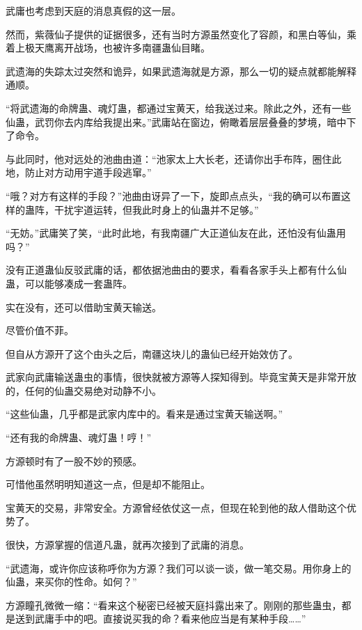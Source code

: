 
\begin{this_body}

武庸也考虑到天庭的消息真假的这一层。

然而，紫薇仙子提供的证据很多，还有当时方源虽然变化了容颜，和黑白等仙，乘着上极天鹰离开战场，也被许多南疆蛊仙目睹。

武遗海的失踪太过突然和诡异，如果武遗海就是方源，那么一切的疑点就都能解释通顺。

“将武遗海的命牌蛊、魂灯蛊，都通过宝黄天，给我送过来。除此之外，还有一些仙蛊，武罚你去内库给我提出来。”武庸站在窗边，俯瞰着层层叠叠的梦境，暗中下了命令。

与此同时，他对远处的池曲由道：“池家太上大长老，还请你出手布阵，圈住此地，防止对方动用宇道手段逃窜。”

“哦？对方有这样的手段？”池曲由讶异了一下，旋即点点头，“我的确可以布置这样的蛊阵，干扰宇道运转，但我此时身上的仙蛊并不足够。”

“无妨。”武庸笑了笑，“此时此地，有我南疆广大正道仙友在此，还怕没有仙蛊用吗？”

没有正道蛊仙反驳武庸的话，都依据池曲由的要求，看看各家手头上都有什么仙蛊，可以能够凑成一套蛊阵。

实在没有，还可以借助宝黄天输送。

尽管价值不菲。

但自从方源开了这个由头之后，南疆这块儿的蛊仙已经开始效仿了。

武家向武庸输送蛊虫的事情，很快就被方源等人探知得到。毕竟宝黄天是非常开放的，任何的仙蛊交易绝对动静不小。

“这些仙蛊，几乎都是武家内库中的。看来是通过宝黄天输送啊。”

“还有我的命牌蛊、魂灯蛊！哼！”

方源顿时有了一股不妙的预感。

可惜他虽然明明知道这一点，但是却不能阻止。

宝黄天的交易，非常安全。方源曾经依仗这一点，但现在轮到他的敌人借助这个优势了。

很快，方源掌握的信道凡蛊，就再次接到了武庸的消息。

“武遗海，或许你应该称呼你为方源？我们可以谈一谈，做一笔交易。用你身上的仙蛊，来买你的性命。如何？”

方源瞳孔微微一缩：“看来这个秘密已经被天庭抖露出来了。刚刚的那些蛊虫，都是送到武庸手中的吧。直接说买我的命？看来他应当是有某种手段……”


\end{this_body}

